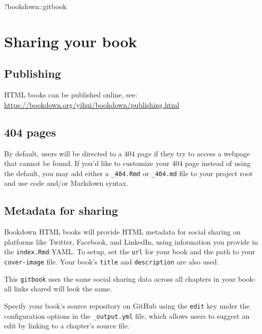 \documentclass[
]{book}
\newenvironment{Shaded}{\begin{snugshade}}{\end{snugshade}}
\newcommand{\NormalTok}[1]{#1}
\newcommand{\SpecialCharTok}[1]{\textcolor[rgb]{0.00,0.00,0.00}{#1}}
\begin{document}
\begin{Shaded}
\begin{Highlighting}[]
\NormalTok{?bookdown}\SpecialCharTok{::}\NormalTok{gitbook}
\end{Highlighting}
\end{Shaded}

\hypertarget{sharing-your-book-2}{%
\chapter{Sharing your book}\label{sharing-your-book-2}}

\hypertarget{publishing-4}{%
\section{Publishing}\label{publishing-4}}

HTML books can be published online, see: \url{https://bookdown.org/yihui/bookdown/publishing.html}

\hypertarget{pages-4}{%
\section{404 pages}\label{pages-4}}

By default, users will be directed to a 404 page if they try to access a webpage that cannot be found. If you'd like to customize your 404 page instead of using the default, you may add either a \texttt{\_404.Rmd} or \texttt{\_404.md} file to your project root and use code and/or Markdown syntax.

\hypertarget{metadata-for-sharing-4}{%
\section{Metadata for sharing}\label{metadata-for-sharing-4}}

Bookdown HTML books will provide HTML metadata for social sharing on platforms like Twitter, Facebook, and LinkedIn, using information you provide in the \texttt{index.Rmd} YAML. To setup, set the \texttt{url} for your book and the path to your \texttt{cover-image} file. Your book's \texttt{title} and \texttt{description} are also used.

This \texttt{gitbook} uses the same social sharing data across all chapters in your book- all links shared will look the same.

Specify your book's source repository on GitHub using the \texttt{edit} key under the configuration options in the \texttt{\_output.yml} file, which allows users to suggest an edit by linking to a chapter's source file.
\end{document}
